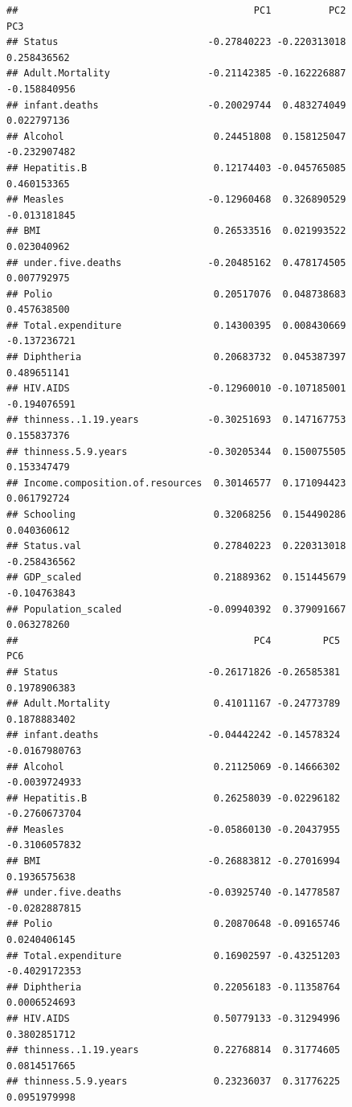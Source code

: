 \documentclass[
]{article}
\begin{document}
\begin{verbatim}
##                                         PC1          PC2          PC3
## Status                          -0.27840223 -0.220313018  0.258436562
## Adult.Mortality                 -0.21142385 -0.162226887 -0.158840956
## infant.deaths                   -0.20029744  0.483274049  0.022797136
## Alcohol                          0.24451808  0.158125047 -0.232907482
## Hepatitis.B                      0.12174403 -0.045765085  0.460153365
## Measles                         -0.12960468  0.326890529 -0.013181845
## BMI                              0.26533516  0.021993522  0.023040962
## under.five.deaths               -0.20485162  0.478174505  0.007792975
## Polio                            0.20517076  0.048738683  0.457638500
## Total.expenditure                0.14300395  0.008430669 -0.137236721
## Diphtheria                       0.20683732  0.045387397  0.489651141
## HIV.AIDS                        -0.12960010 -0.107185001 -0.194076591
## thinness..1.19.years            -0.30251693  0.147167753  0.155837376
## thinness.5.9.years              -0.30205344  0.150075505  0.153347479
## Income.composition.of.resources  0.30146577  0.171094423  0.061792724
## Schooling                        0.32068256  0.154490286  0.040360612
## Status.val                       0.27840223  0.220313018 -0.258436562
## GDP_scaled                       0.21889362  0.151445679 -0.104763843
## Population_scaled               -0.09940392  0.379091667  0.063278260
##                                         PC4         PC5           PC6
## Status                          -0.26171826 -0.26585381  0.1978906383
## Adult.Mortality                  0.41011167 -0.24773789  0.1878883402
## infant.deaths                   -0.04442242 -0.14578324 -0.0167980763
## Alcohol                          0.21125069 -0.14666302 -0.0039724933
## Hepatitis.B                      0.26258039 -0.02296182 -0.2760673704
## Measles                         -0.05860130 -0.20437955 -0.3106057832
## BMI                             -0.26883812 -0.27016994  0.1936575638
## under.five.deaths               -0.03925740 -0.14778587 -0.0282887815
## Polio                            0.20870648 -0.09165746  0.0240406145
## Total.expenditure                0.16902597 -0.43251203 -0.4029172353
## Diphtheria                       0.22056183 -0.11358764  0.0006524693
## HIV.AIDS                         0.50779133 -0.31294996  0.3802851712
## thinness..1.19.years             0.22768814  0.31774605  0.0814517665
## thinness.5.9.years               0.23236037  0.31776225  0.0951979998

\end{verbatim}
\end{document}
